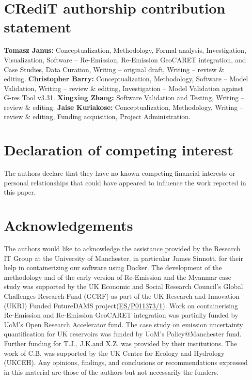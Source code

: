 \documentclass[review, authoryear, 1p]{elsarticle} %
\begin{document}
\section{CRediT authorship contribution statement}
\textbf{Tomasz Janus:} Conceptualization, Methodology, Formal analysis, Investigation, Visualization, Software -- Re-Emission, Re-Emission GeoCARET integration, and Case Studies, Data Curation, Writing -- original draft, Writing -- review \& editing.
\textbf{Christopher Barry:} Conceptualization, Methodology, Software -- Model Validation, Writing -- review \& editing, Investigation -- Model Validation against G-res Tool v3.31.
\textbf{Xingxing Zhang:} Software Validation and Testing, Writing -- review \& editing.
\textbf{Jaise Kuriakose:} Conceptualization, Methodology, Writing -- review \& editing, Funding acquisition, Project Administration.

\section{Declaration of competing interest}
The authors declare that they have no known competing financial interests or personal relationships that could have appeared to influence the work reported in this paper.

\section{Acknowledgements}
The authors would like to acknowledge the assistance provided by the Research IT Group at the University of Manchester, in particular James Sinnott, for their help in containerizing our software using Docker.
The development of the methodology and of the early version of Re-Emission and the Myanmar case study was supported by the UK Economic and Social Research Council's Global Challenges Research Fund (GCRF) as part of the UK Research and Innovation (UKRI) Funded FutureDAMS project(\href{www.futuredams.org}{ES/P011373/1}).
Work on containerising Re-Emission and Re-Emission GeoCARET integration was partially funded by UoM's Open Research Accelerator fund.
The case study on emission uncertainty quantification for UK reservoirs was funded by UoM's Policy@Manchester fund.
Further funding for T.J., J.K.and X.Z. was provided by their institutions. 
The work of C.B. was supported by the UK Centre for Ecology and Hydrology (UKCEH). 
Any opinions, findings, and conclusions or recommendations expressed in this material are those of the authors but not necessarily the funders.
\end{document}
